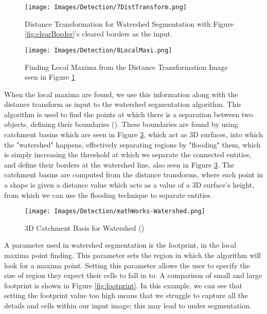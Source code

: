 \documentclass[12pt a4paper]{article}
\begin{document}
\begin{figure}
    \centering
    \texttt{[image: Images/Detection/7DistTransform.png]}
    \caption{Distance Transformation for Watershed Segmentation with Figure \ref{fig:clearBorder}'s cleared borders as the input.}
    \label{fig:distanceTransform}
\end{figure}

\begin{figure}
    \centering
    \texttt{[image: Images/Detection/8LocalMaxi.png]}
    \caption{Finding Local Maxima from the Distance Transformation Image seen in Figure \ref{fig:distanceTransform}}
    \label{fig:localMaxima}
\end{figure}

When the local maxima are found, we use this information along with the distance transform as input to the watershed segmentation algorithm. This algorithm is used to find the points at which there is a separation between two objects, defining their boundaries (\cite{beucher1992morphological}). These boundaries are found by using catchment basins which are seen in Figure \ref{fig:catchment}, which act as 3D surfaces, into which the "watershed" happens, effectively separating regions by "flooding" them, which is simply increasing the threshold at which we separate the connected entities, and define their borders at the watershed line, also seen in Figure \ref{fig:catchment}. The catchment basins are computed from the distance transforms, where each point in a shape is given a distance value which acts as a value of a 3D surface's height, from which we can use the flooding technique to separate entities.

\begin{figure}
    \centering
    \texttt{[image: Images/Detection/mathWorks-Watershed.png]}
    \caption{3D Catchment Basis for Watershed (\cite{matlab&simulink})}
    \label{fig:catchment}
\end{figure}

A parameter used in watershed segmentation is the footprint, in the local maxima point finding. This parameter sets the region in which the algorithm will look for a maxima point. Setting this parameter allows the user to specify the size of region they expect their cells to fall in to. A comparison of small and large footprint is shown in Figure \ref{fig:footprint}. In this example, we can see that setting the footprint value too high means that we struggle to capture all the details and cells within our input image; this may lead to under segmentation.
\end{document}
